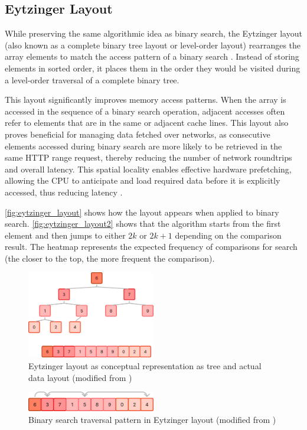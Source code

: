 \subsection{Eytzinger Layout}
\label{tb:eytzinger_layout}

While preserving the same algorithmic idea as binary search, the Eytzinger layout (also known as a complete binary tree layout or level-order layout) rearranges the array elements to match the access pattern of a binary search \citep{binary_search}. Instead of storing elements in sorted order, it places them in the order they would be visited during a level-order traversal of a complete binary tree.

This layout significantly improves memory access patterns. When the array is accessed in the sequence of a binary search operation, adjacent accesses often refer to elements that are in the same or adjacent cache lines. This layout also proves beneficial for managing data fetched over networks, as consecutive elements accessed during binary search are more likely to be retrieved in the same HTTP range request, thereby reducing the number of network roundtrips and overall latency. This spatial locality enables effective hardware prefetching, allowing the CPU to anticipate and load required data before it is explicitly accessed, thus reducing latency \citep{binary_search}.

\autoref{fig:eytzinger_layout} shows how the layout appears when applied to binary search. \autoref{fig:eytzinger_layout2} shows that the algorithm starts from the first element and then jumps to either $2k$ or $2k+1$ depending on the comparison result. The heatmap represents the expected frequency of comparisons for search (the closer to the top, the more frequent the comparison).

\begin{figure}[ht]
  \centering
  \includegraphics[width=0.5\textwidth]{figs/related_work_theoretical_bg/eytzinger_layout.png}
  \caption{Eytzinger layout as conceptual representation as tree and actual data layout (modified from \citet{binary_search})}
  \label{fig:eytzinger_layout}
\end{figure}
\begin{figure}[ht]
  \centering
  \includegraphics[width=0.5\textwidth]{figs/related_work_theoretical_bg/eytzinger_layout2.png}
  \caption{Binary search traversal pattern in Eytzinger layout (modified from \citet{binary_search})}
  \label{fig:eytzinger_layout2}
\end{figure}

